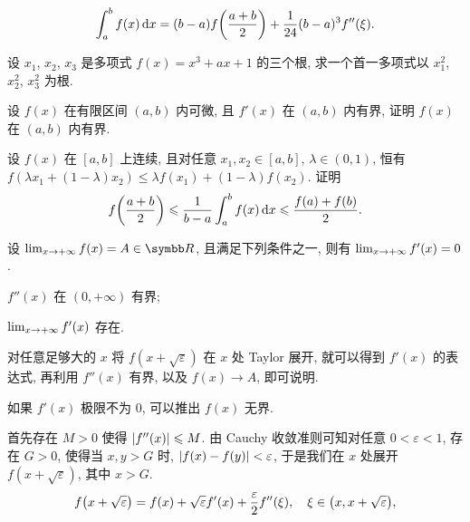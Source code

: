 \begin{exercise}[series=exer]
    \begin{align*}
        \int_{a}^{b} f(x) \dd{x} = (b - a) f\qty(\frac{a + b}{2}) + \frac{1}{24}(b - a)^{3} f''(\xi).
    \end{align*}
    \item 设 $ x_{1} $, $ x_{2} $, $ x_{3} $ 是多项式 $ f(x) = x^{3} + ax + 1 $ 的三个根, 求一个首一多项式以 $ x_{1}^{2} $, $ x_{2}^{2} $, $ x_{3}^{2} $ 为根.
    \item 设 $ f(x) $ 在有限区间 $ (a, b) $ 内可微, 且 $ f'(x) $ 在 $ (a, b) $ 内有界, 证明 $ f(x) $ 在 $ (a, b) $ 内有界.
    \item 设 $ f(x) $ 在 $ [a, b] $ 上连续, 且对任意 $ x_{1}, x_{2} \in [a, b] $, $ \lambda \in (0, 1) $, 恒有 $ f(\lambda x_{1} + (1-\lambda) x_{2}) \le \lambda f(x_{1}) + (1 - \lambda) f(x_{2}) $. 证明
    \begin{align*}
        f\qty(\frac{a+b}{2}) \leqslant \frac{1}{b - a}\int_{a}^{b} f(x) \dd{x} \leqslant \frac{f(a) + f(b)}{2}.
    \end{align*}
    \item 设 $ \limit{x}{+\infty} f(x) = A \in \R $, 且满足下列条件之一, 则有 $ \lim_{x \to +\infty} f'(x) = 0 $.
    \begin{exercise}
        \item $ f''(x) $ 在 $ (0, +\infty) $ 有界;
        \item $ \lim_{x \to +\infty} f'(x) $ 存在.
    \end{exercise}
    \begin{hint}
        \begin{hintsheet}
            \item 对任意足够大的 $ x $ 将 $ f(x+\sqrt{\varepsilon}) $ 在 $ x $ 处 Taylor 展开, 就可以得到 $ f'(x) $ 的表达式, 再利用 $ f''(x) $ 有界, 以及 $ f(x) \to A $, 即可说明.
            \item 如果 $ f'(x) $ 极限不为 $ 0 $, 可以推出 $ f(x) $ 无界. 
        \end{hintsheet}
    \end{hint}
    \begin{answer}
        \begin{answersheet}
            \item 首先存在 $ M > 0 $ 使得 $ \abs{f''(x)} \leqslant M $. 由 Cauchy 收敛准则可知对任意 $ 0 < \varepsilon < 1 $, 存在 $ G > 0 $, 使得当 $ x, y > G $ 时, $ \abs{f(x) - f(y)} < \varepsilon $, 于是我们在 $ x $ 处展开 $ f(x + \sqrt{\varepsilon}) $, 其中 $ x > G $.
            \begin{align*}
                f\qty(x + \sqrt{\varepsilon}) = f(x) + \sqrt{\varepsilon}f'(x) + \frac{\varepsilon}{2}f''(\xi),\quad \xi \in \qty(x, x + \sqrt{\varepsilon}),

\end{align*}
\end{answersheet}
\end{answer}
\end{exercise}
